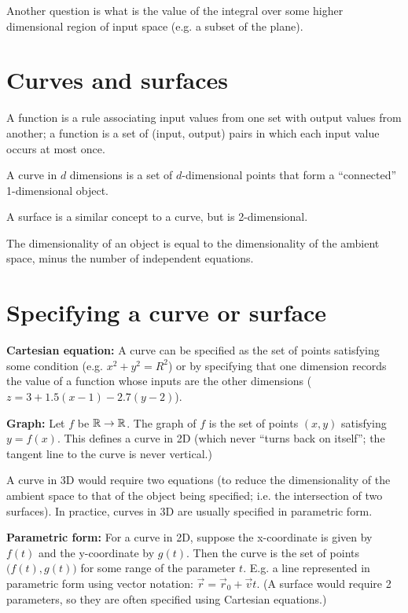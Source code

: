 \documentclass[12pt]{article}
\begin{document}
Another question is what is the value of the integral over some higher
dimensional region of input space (e.g. a subset of the plane).

\section*{Curves and surfaces}

A function is a rule associating input values from one set with output values
from another; a function is a set of (input, output) pairs in which each input
value occurs at most once.

A curve in $d$ dimensions is a set of $d$-dimensional points that form a
``connected'' 1-dimensional object.

A surface is a similar concept to a curve, but is 2-dimensional.

The dimensionality of an object is equal to the dimensionality of the ambient
space, minus the number of independent equations.

\section*{Specifying a curve or surface}

\textbf{Cartesian equation:} A curve can be specified as the set of points
satisfying some condition (e.g. $x^2 + y^2 = R^2$) or by specifying that one
dimension records the value of a function whose inputs are the other
dimensions ($z = 3 + 1.5(x-1) - 2.7(y-2)$).

\textbf{Graph:} Let $f$ be $\mathbb{R} \to \mathbb{R}$. The graph of $f$ is the set of points
$(x,y)$ satisfying $y = f(x)$. This defines a curve in 2D (which never ``turns
back on itself''; the tangent line to the curve is never vertical.)

A curve in 3D would require two equations (to reduce the dimensionality of the
ambient space to that of the object being specified; i.e. the intersection of
two surfaces). In practice, curves in 3D are usually specified in parametric
form.

\textbf{Parametric form:} For a curve in 2D, suppose the x-coordinate is given
by $f(t)$ and the y-coordinate by $g(t)$. Then the curve is the set of points
$\big(f(t), g(t)\big)$ for some range of the parameter $t$. E.g. a line
represented in parametric form using vector notation:
$\vec r = \vec r_0 + \vec v t$. (A surface would require 2 parameters, so they
are often specified using Cartesian equations.)
\end{document}
